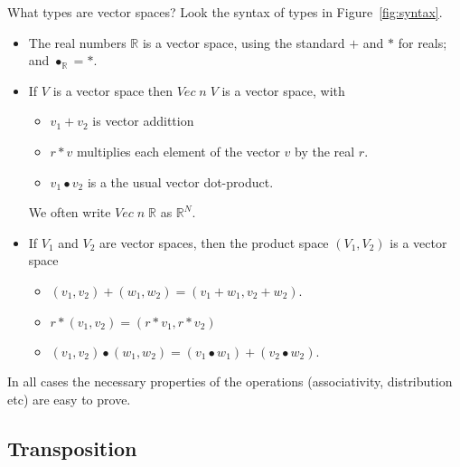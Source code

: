 \documentclass[sigplan,review]{acmart}
\renewcommand{\vector}[2]{\mathit{Vec}\;#1\;#2}   %
\newcommand{\real}{\mathbb{R}}       %
\newcommand{\dotprod}{\bullet}    %
\begin{document}
What types are vector spaces?  Look the syntax of types in Figure~\ref{fig:syntax}.
\begin{itemize}
  \item The real numbers $\real$ is a vector space, using the standard $+$ and $*$ for reals; and $\dotprod_{\real} = *$.
  \item If $V$ is a vector space then $\vector{n}{V}$ is a vector space, with
    \begin{itemize}
      \item $v_1 + v_2$ is vector addittion
      \item $r * v$ multiplies each element of the vector $v$ by the real $r$.
      \item $v_1 \dotprod v_2$ is a the usual vector dot-product.
    \end{itemize}
    We often write $\vector{n}{\real}$ as $\real^N$.
  \item If $V_1$ and $V_2$ are vector spaces, then the product space $(V_1, V_2)$ is a vector space
    \begin{itemize}
      \item $(v_1,v_2) +(w_1,w_2) = (v_1 + w_1, v_2 + w_2)$.
      \item $r * (v_1,v_2) = (r*v_1, r*v_2)$
      \item $(v_1,v_2) \dotprod (w_1,w_2) = (v_1 \dotprod w_1) + (v_2 \dotprod w_2)$.
    \end{itemize}
\end{itemize}
In all cases the necessary properties of the operations (associativity, distribution etc) are easy to prove.

\subsection{Transposition}
\end{document}
